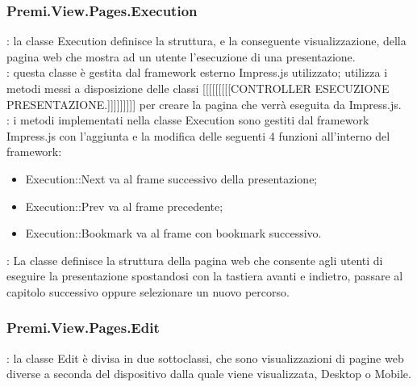 {		\subsubsection{Premi.View.Pages.Execution}{
			\textbf{\tipo}: la classe Execution definisce la struttura, e la conseguente visualizzazione, della pagina web che mostra ad un utente l'esecuzione di una presentazione.\\
			\textbf{\relaz}: questa classe è gestita dal framework esterno Impress.js utilizzato; utilizza i metodi messi a disposizione delle classi [[[[[[[[[CONTROLLER ESECUZIONE PRESENTAZIONE.]]]]]]]]] per creare la pagina che verrà eseguita da Impress.js.\\
			\textbf{\interfacce}: i metodi implementati nella classe Execution sono gestiti dal framework Impress.js con l'aggiunta e la modifica delle seguenti 4 funzioni all'interno del framework:
			\begin{itemize}
				\item Execution::Next va al frame successivo della presentazione;
				\item Execution::Prev va al frame precedente;
				\item Execution::Bookmark va al frame con bookmark successivo.
			\end{itemize}
			\textbf{\attivita}: La classe definisce la struttura della pagina web che consente agli utenti di eseguire la presentazione spostandosi con la tastiera avanti e indietro, passare al capitolo successivo oppure selezionare un nuovo percorso.\\
		}
		\subsubsection{Premi.View.Pages.Edit}{
			\textbf{\tipo}: la classe Edit è divisa in due sottoclassi, che sono visualizzazioni di pagine web diverse a seconda del dispositivo dalla quale viene visualizzata, Desktop o Mobile.\\
		}
}
